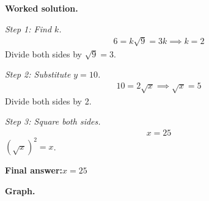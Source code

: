 \documentclass[11pt]{article}
\begin{document}
\textbf{Worked solution.}

\textit{Step 1: Find \( k \).}
\[\begin{gathered}
6 = k\sqrt{9} = 3k \implies k = 2
\end{gathered}\]
Divide both sides by \( \sqrt{9} = 3 \).

\textit{Step 2: Substitute \( y = 10 \).}
\[\begin{gathered}
10 = 2\sqrt{x} \implies \sqrt{x} = 5
\end{gathered}\]
Divide both sides by 2.

\textit{Step 3: Square both sides.}
\[\begin{gathered}
x = 25
\end{gathered}\]
\( (\sqrt{x})^2 = x \).

\begin{answerbox}
\textbf{Final answer:}\quad \(\displaystyle  x = 25 \)
\end{answerbox}
\textbf{Graph.}
\end{document}
